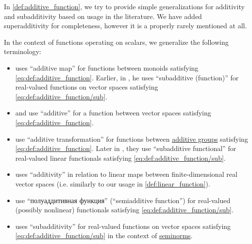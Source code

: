 \begin{remark}\label{rem:additive_function_terminology}
  In \cref{def:additive_function}, we try to provide simple generalizations for additivity and subadditivity based on usage in the literature. We have added superadditivity for completeness, however it is a properly rarely mentioned at all.

  In the context of functions operating on scalars, we generalize the following terminology:
  \begin{itemize}
    \item \Textcite[\S 8.3]{Schechter1997AnalysisHandbook} uses \enquote{additive map} for functions between monoids satisfying \eqref{eq:def:additive_function}. Earlier, in \cite[\S 7.1]{Schechter1997AnalysisHandbook}, he uses \enquote{subadditive (function)} for real-valued functions on vector spaces satisfying \eqref{eq:def:additive_function/sub}.

    \item \Textcite[exerc. 2.7.38]{FriedbergInselSpence2018LinearAlgebra} and \textcite[122]{ЛюстерникСоболев1965ФункциональныйАнализ} use \enquote{additive} for a function between vector spaces satisfying \eqref{eq:def:additive_function}.

    \item \Textcite[def. 2.2.1]{HillePhillips1996FunctionalAnalysis} use \enquote{additive transformation} for functions between \hyperref[def:additive_semigroup]{additive groups} satisfying \eqref{eq:def:additive_function}. Later in \cite[def. 2.5.1]{HillePhillips1996FunctionalAnalysis}, they use \enquote{subadditive functional} for real-valued linear functionals satisfying \eqref{eq:def:additive_function/sub}.

    \item \Textcite[def. 6.1.6(a)]{Tao2022AnalysisII} uses \enquote{additivity} in relation to linear maps between finite-dimensional real vector spaces (i.e. similarly to our usage in \cref{def:linear_function}).

    \item \Textcite[80]{КанторовичАкилов1984ФункциональныйАнализ} use \enquote{полуаддитивная функция} (\enquote{semiadditive function}) for real-valued (possibly nonlinear) functionals satisfying \eqref{eq:def:additive_function/sub}.

    \item \Textcite[25]{Rudin1991FunctionalAnalysis} uses \enquote{subadditivity} for real-valued functions on vector spaces satisfying \eqref{eq:def:additive_function/sub} in the context of \hyperref[def:seminorm]{seminorms}.


\end{itemize}
\end{remark}
